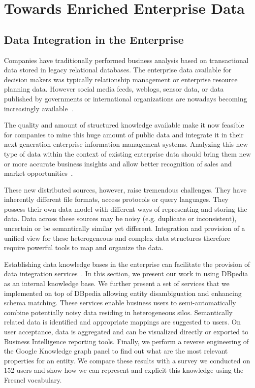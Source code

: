 \documentclass[a4paper,11pt,twoside]{ThesisStyle}
\begin{document}
\let\cleardoublepage\clearpage
\chapter{Towards Enriched Enterprise Data}\label{chapter:2}

\section{Data Integration in the Enterprise}\label{chapter:rubix}
Companies have traditionally performed business analysis based on transactional data stored in legacy relational databases. The enterprise data available for decision makers was typically relationship management or enterprise resource planning data. However social media feeds, weblogs, sensor data, or data published by governments or international organizations are nowadays becoming increasingly available~\cite{Boyd:Article:11}.

The quality and amount of structured knowledge available make it now feasible for companies to mine this huge amount of public data and integrate it in their next-generation enterprise information management systems. Analyzing this new type of data within the context of existing enterprise data should bring them new or more accurate business insights and allow better recognition of sales and market opportunities~\cite{LaValle:MIT:11}.

These new distributed sources, however, raise tremendous challenges. They have inherently different file formats, access protocols or query languages. They possess their own data model with different ways of representing and storing the data. Data across these sources may be noisy (e.g. duplicate or inconsistent), uncertain or be semantically similar yet different. Integration and provision of a unified view for these heterogeneous and complex data structures therefore require powerful tools to map and organize the data.

Establishing data knowledge bases in the enterprise can facilitate the provision of data integration services~\cite{Frischmuth:SemWebJorunal:12}. In this section, we present our work in using DBpedia as an internal knowledge base. We further present a set of services that we implemented on top of DBpedia allowing entity disambiguation and enhancing schema matching. These services enable business users to semi-automatically combine potentially noisy data residing in heterogeneous silos. Semantically related data is identified and appropriate mappings are suggested to users. On user acceptance, data is aggregated and can be visualized directly or exported to Business Intelligence reporting tools. Finally, we perform a reverse engineering of the Google Knowledge graph panel to find out what are the most relevant properties for an entity. We compare these results with a survey we conducted on 152 users and show how we can represent and explicit this knowledge using the Fresnel vocabulary.
\end{document}
